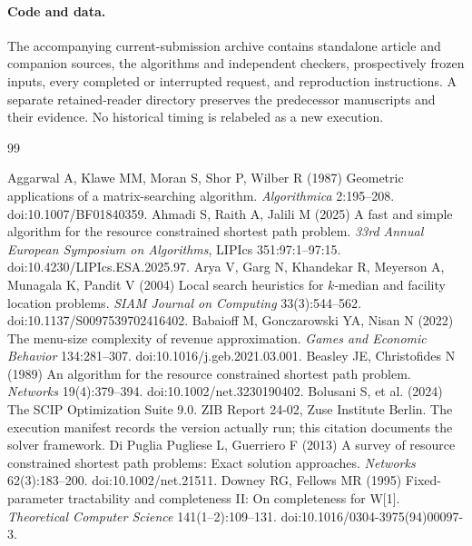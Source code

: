 \documentclass[11pt,letterpaper]{article}
\theoremstyle{definition}\newtheorem{remark}[theorem]{Remark}
\begin{document}
\paragraph{Code and data.} The accompanying current-submission archive contains standalone article and companion sources, the algorithms and independent checkers, prospectively frozen inputs, every completed or interrupted request, and reproduction instructions. A separate retained-reader directory preserves the predecessor manuscripts and their evidence. No historical timing is relabeled as a new execution.
\clearpage{}\label{refs-start}
\begin{thebibliography}{99}\raggedright
{}
Aggarwal A, Klawe MM, Moran S, Shor P, Wilber R (1987) Geometric applications of a matrix-searching algorithm. \emph{Algorithmica} 2:195--208. doi:10.1007/BF01840359.
Ahmadi S, Raith A, Jalili M (2025) A fast and simple algorithm for the resource constrained shortest path problem. \emph{33rd Annual European Symposium on Algorithms}, LIPIcs 351:97:1--97:15. doi:10.4230/LIPIcs.ESA.2025.97.
Arya V, Garg N, Khandekar R, Meyerson A, Munagala K, Pandit V (2004) Local search heuristics for $k$-median and facility location problems. \emph{SIAM Journal on Computing} 33(3):544--562. doi:10.1137/S0097539702416402.
Babaioff M, Gonczarowski YA, Nisan N (2022) The menu-size complexity of revenue approximation. \emph{Games and Economic Behavior} 134:281--307. doi:10.1016/j.geb.2021.03.001.
Beasley JE, Christofides N (1989) An algorithm for the resource constrained shortest path problem. \emph{Networks} 19(4):379--394. doi:10.1002/net.3230190402.
Bolusani S, et al. (2024) The SCIP Optimization Suite 9.0. ZIB Report 24-02, Zuse Institute Berlin. The execution manifest records the version actually run; this citation documents the solver framework.
Di Puglia Pugliese L, Guerriero F (2013) A survey of resource constrained shortest path problems: Exact solution approaches. \emph{Networks} 62(3):183--200. doi:10.1002/net.21511.
Downey RG, Fellows MR (1995) Fixed-parameter tractability and completeness II: On completeness for W[1]. \emph{Theoretical Computer Science} 141(1--2):109--131. doi:10.1016/0304-3975(94)00097-3.

\end{thebibliography}
\end{document}
